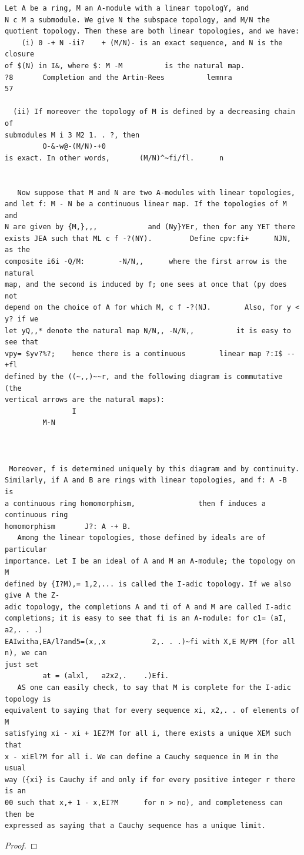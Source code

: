 \begin{theorem}\label{mcrt-auto-theorem-8-1}\uses{}
\begin{verbatim}
Let A be a ring, M an A-module with a linear topologY, and
N c M a submodule. We give N the subspace topology, and M/N the
quotient topology. Then these are both linear topologies, and we have:
    (i) 0 -+ N -ii?    + (M/N)- is an exact sequence, and N is the closure
of $(N) in I&, where $: M -M          is the natural map.
?8       Completion and the Artin-Rees          lemnra                         57

  (ii) If moreover the topology of M is defined by a decreasing chain of
submodules M i 3 M2 1. . ?, then
         O-&-w@-(M/N)-+0
is exact. In other words,       (M/N)^~fi/fl.      n


   Now suppose that M and N are two A-modules with linear topologies,
and let f: M - N be a continuous linear map. If the topologies of M and
N are given by {M,},,,            and (Ny}YEr, then for any YET there
exists JEA such that ML c f -?(NY).         Define cpv:fi+      NJN, as the
composite i6i -Q/M:        -N/N,,      where the first arrow is the natural
map, and the second is induced by f; one sees at once that (py does not
depend on the choice of A for which M, c f -?(NJ.        Also, for y < y? if we
let yQ,,* denote the natural map N/N,, -N/N,,          it is easy to see that
vpy= $yv?%?;    hence there is a continuous        linear map ?:I$ --+fl
defined by the ((~,,)~~r, and the following diagram is commutative          (the
vertical arrows are the natural maps):
                I
         M-N



 Moreover, f is determined uniquely by this diagram and by continuity.
Similarly, if A and B are rings with linear topologies, and f: A -B             is
a continuous ring homomorphism,               then f induces a continuous ring
homomorphism       J?: A -+ B.
   Among the linear topologies, those defined by ideals are of particular
importance. Let I be an ideal of A and M an A-module; the topology on M
defined by {I?M),= 1,2,... is called the I-adic topology. If we also give A the Z-
adic topology, the completions A and ti of A and M are called I-adic
completions; it is easy to see that fi is an A-module: for c1= (aI, a2,. . .)
EAIwitha,EA/l?and5=(x,,x           2,. . .)~fi with X,E M/PM (for all n), we can
just set
         at = (alxl,   a2x2,.    .)Efi.
   AS one can easily check, to say that M is complete for the I-adic topology is
equivalent to saying that for every sequence xi, x2,. . of elements of M
satisfying xi - xi + 1EZ?M for all i, there exists a unique XEM such that
x - xiEl?M for all i. We can define a Cauchy sequence in M in the usual
way ({xi} is Cauchy if and only if for every positive integer r there is an
00 such that x,+ 1 - x,EI?M      for n > no), and completeness can then be
expressed as saying that a Cauchy sequence has a unique limit.
\end{verbatim}
\end{theorem}
\begin{proof}
\notready
\end{proof}


